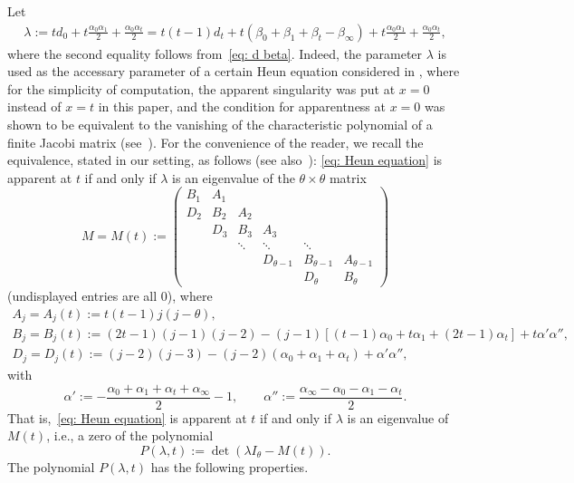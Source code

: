 \documentclass[pdftex]{sigma}
\numberwithin{equation}{section}
\begin{document}
Let
\begin{gather} \label{eq: lambda}
 \lambda:=td_0+t\frac{\alpha_0\alpha_1}2
 +\frac{\alpha_0\alpha_t}2
 =t(t-1)d_t+t(\beta_0+\beta_1+\beta_t-\beta_\infty)
 +t\frac{\alpha_0\alpha_1}2+\frac{\alpha_0\alpha_t}2,
\end{gather}
where the second equality follows from~\eqref{eq: d beta}. Indeed,
the parameter $\lambda$ is used as the accessary parameter of a
certain Heun equation considered in \cite{Quadrilateral}, where for
the simplicity of computation, the apparent singularity was put at
$x=0$ instead of $x=t$ in this paper, and the condition for
apparentness at $x=0$ was shown to be equivalent to the vanishing of
the characteristic polynomial of a finite Jacobi matrix (see~\cite[Proposition 2.4 and equation~(2.8)]{Quadrilateral}). For the
convenience of the reader, we recall the equivalence, stated in our
setting, as follows (see also~\mbox{\cite[Lemma B.8]{Chen-Lin-Yang}}):
\eqref{eq: Heun equation} is apparent at $t$ if and only if
 $\lambda$ is an eigenvalue of the $\theta\times\theta$ matrix
 \begin{equation} \label{eq: M}
 M=M(t):=\begin{pmatrix}
 B_1 & A_1 & & & & \\
 D_2 & B_2 & A_2 & & & \\
 & D_3 & B_3 & A_3 & & \\
 & & \ddots & \ddots & \ddots & \\
 & & & D_{\theta-1} & B_{\theta-1} & A_{\theta-1} \\
 & & & & D_{\theta} & B_{\theta} \end{pmatrix}
 \end{equation}
 (undisplayed entries are all $0$), where
 \begin{gather*}
 A_j =A_j(t):=t(t-1)j(j-\theta), \\
 B_j =B_j(t):=(2t-1)(j-1)(j-2) -(j-1)[(t-1)\alpha_0+t\alpha_1
 +(2t-1)\alpha_t]
 +t\alpha'\alpha'', \\
 D_j =D_j(t):=(j-2)(j-3)-(j-2)(\alpha_0+\alpha_1+\alpha_t)
 +\alpha'\alpha'',
 \end{gather*}
 with
\[
 \alpha':=-\frac{\alpha_0+\alpha_1+\alpha_t+\alpha_\infty}2-1,
 \qquad \alpha'':=\frac{\alpha_\infty-\alpha_0-\alpha_1-\alpha_t}2.
\]
 That is,~\eqref{eq: Heun equation} is apparent at $t$ if and only if
 $\lambda$ is an eigenvalue of $M(t)$, i.e., a zero of the polynomial
\[
 P(\lambda,t):=\det(\lambda I_\theta-M(t)).
\]
 The polynomial $P(\lambda,t)$ has the following properties.
\end{document}
